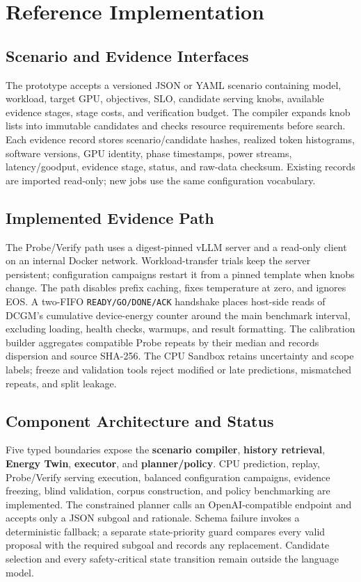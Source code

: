 \section{Reference Implementation}

\subsection{Scenario and Evidence Interfaces}

The prototype accepts a versioned JSON or YAML scenario containing model,
workload, target GPU, objectives, SLO, candidate serving knobs, available
evidence stages, stage costs, and verification budget.  The compiler expands
knob lists into immutable candidates and checks resource requirements before
search.  Each evidence record stores scenario/candidate hashes, realized token
histograms, software versions, GPU identity, phase timestamps, power streams,
latency/goodput, evidence stage, status, and raw-data checksum.  Existing
\bench{} records are imported read-only; new jobs use the same configuration
vocabulary.

\subsection{Implemented Evidence Path}

The Probe/Verify path uses a digest-pinned vLLM server and a read-only client on
an internal Docker network.  Workload-transfer trials keep the server
persistent; configuration campaigns restart it from a pinned template when
knobs change.  The path disables prefix caching, fixes temperature at zero, and
ignores EOS.  A two-FIFO \texttt{READY/GO/DONE/ACK} handshake places host-side
reads of DCGM's cumulative device-energy counter around the main benchmark
interval, excluding loading, health checks, warmups, and result formatting.
The calibration builder aggregates compatible Probe repeats by their median
and records dispersion and source SHA-256.  The CPU Sandbox retains uncertainty
and scope labels; freeze and validation tools reject modified or late
predictions, mismatched repeats, and split leakage.

\subsection{Component Architecture and Status}

Five typed boundaries expose the \textbf{scenario compiler}, \textbf{history
retrieval}, \textbf{Energy Twin}, \textbf{executor}, and
\textbf{planner/policy}.  CPU prediction, replay, Probe/Verify serving
execution, balanced configuration campaigns, evidence freezing, blind
validation, corpus construction, and policy benchmarking are implemented.  The
constrained planner calls an OpenAI-compatible endpoint and accepts only a JSON
subgoal and rationale.  Schema failure invokes a deterministic fallback; a
separate state-priority guard compares every valid proposal with the required
subgoal and records any replacement.  Candidate selection and every
safety-critical state transition remain outside the language model.

